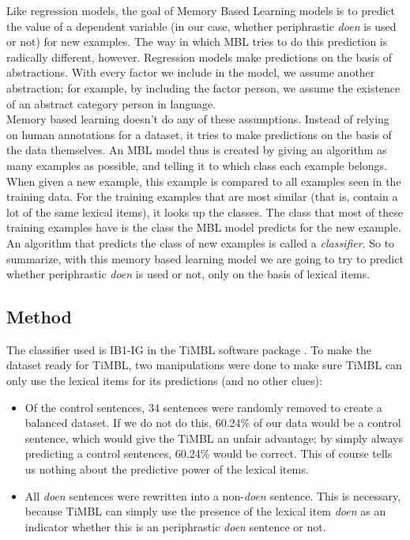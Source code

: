 \documentclass[12pt]{article}
\begin{document}
Like regression models, the goal of Memory Based Learning models is to predict the value of a dependent variable (in our case, whether periphrastic \emph{doen} is used or not) for new examples. The way in which MBL tries to do this prediction is radically different, however. Regression models make predictions on the basis of abstractions. With every factor we include in the model, we assume another abstraction; for example, by including the factor person, we assume the existence of an abstract category person in language.\\\indent
Memory based learning doesn't do any of these assumptions. Instead of relying on human annotations for a dataset, it tries to make predictions on the basis of the data themselves. An MBL model thus is created by giving an algorithm as many examples as possible, and telling it to which class each example belongs. When given a new example, this example is compared to all examples seen in the training data. For the training examples that are most similar (that is, contain a lot of the same lexical items), it looks up the classes. The class that most of these training examples have is the class the MBL model predicts for the new example. An algorithm that predicts the class of new examples is called a \emph{classifier}. So to summarize, with this memory based learning model we are going to try to predict whether periphrastic \emph{doen} is used or not, only on the basis of lexical items.

\subsection{Method}

The classifier used is IB1-IG in the TiMBL software package \citep{d10}. To make the dataset ready for TiMBL, two manipulations were done to make sure TiMBL can only use the lexical items for its predictions (and no other clues):

\begin{itemize}

\item Of the control sentences, 34 sentences were randomly removed to create a balanced dataset. If we do not do this, 60.24\% of our data would be a control sentence, which would give the TiMBL an unfair advantage; by simply always predicting a control sentences, 60.24\% would be correct. This of course tells us nothing about the predictive power of the lexical items.
\item All \emph{doen} sentences were rewritten into a non-\emph{doen} sentence. This is necessary, because TiMBL can simply use the presence of the lexical item \emph{doen} as an indicator whether this is an periphrastic \emph{doen} sentence or not.

\end{itemize}
\end{document}
